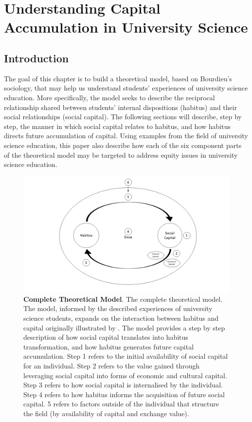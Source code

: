 \chapter{Understanding Capital Accumulation in University Science}


\section{Introduction}
The goal of this chapter is to build a theoretical model, based on Bourdieu's sociology, that may help us understand students' experiences of university science education. More specifically, the model seeks to describe the reciprocal relationship shared between students' internal dispositions (habitus) and their social relationships (social capital). The following sections will describe, step by step, the manner in which social capital relates to habitus, and how habitus directs future accumulation of capital. Using examples from the field of university science education, this paper also describe how each of the six component parts of the theoretical model may be targeted to address equity issues in university science education.

\begin{figure}[ht]
\centering
\includegraphics[width=\textwidth]{C5 - Understanding Capital Accumulation/HabitusSocCap_TheoreticalModel.png}
\caption{\label{fig:TheoreticalModel_C5}\textbf{Complete Theoretical Model}. The complete theoretical model. The model, informed by the described experiences of university science students, expands on the interaction between habitus and capital originally illustrated by \cite{Bourdieu1984}. The model provides a step by step description of how social capital translates into habitus transformation, and how habitus generates future capital accumulation. Step 1 refers to the initial availability of social capital for an individual. Step 2 refers to the value gained through leveraging social capital into forms of economic and cultural capital. Step 3 refers to how social capital is internalised by the individual. Step 4 refers to how habitus informs the acquisition of future social capital. 5 refers to factors outside of the individual that structure the field (by availability of capital and exchange value).}
\end{figure}

